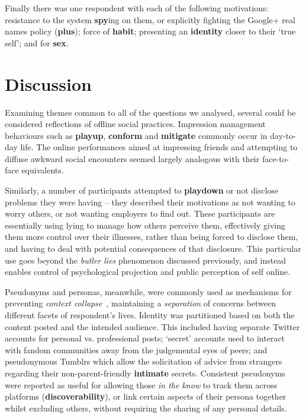 \documentclass{sig-alternate}
\newcommand{\todo}[1]{\textbf{\color{red}TODO: #1}}
\newcommand{\stag}[1]{\textbf{#1}}
\begin{document}
Finally there was one respondent with each of the following motivations: resistance to the system \stag{spy}ing on them, or explicitly fighting the Google+ real names policy (\stag{plus}); force of \stag{habit}; presenting an \stag{identity} closer to their `true self'; and for \stag{sex}.



\section{Discussion}

Examining themes common to all of the questions we analysed, several could be considered reflections of offline social practices. Impression management behaviours such as \stag{playup}, \stag{conform} and \stag{mitigate} 
commonly occur in day-to-day life. The online performances aimed at impressing friends and attempting to diffuse awkward social encounters seemed largely analogous with their face-to-face equivalents.

Similarly, a number of participants attempted to \stag{playdown} or not disclose problems they were having --
they described their motivations as not wanting to worry others, or not wanting employers to find out.
These participants are essentially using lying to manage how others perceive them, effectively giving them more control over their illnesses, rather than being forced to disclose them, and having to deal with potential consequences of that disclosure. This particular use goes beyond the \emph{butler lies} phenomenon discussed previously, and instead enables control of psychological projection and public perception of self online.

Pseudonyms and personas, meanwhile, were commonly used as mechanisms for preventing \emph{context collapse}~\cite{hogan2010presentation,boyd2002faceted,Marwick2010}, maintaining a \emph{separation} of concerns between different facets of respondent's lives. 
Identity was partitioned based on both the content posted and the intended audience. This included having separate Twitter accounts for personal vs. professional posts; `secret' accounts used to interact with fandom communities away from the judgemental eyes of peers; and pseudonymous Tumblrs which allow the solicitation of advice from strangers regarding their non-parent-friendly \stag{intimate} secrets.  Consistent pseudonyms were reported as useful for allowing those \emph{in the know} to track them across platforms (\stag{discoverability}), or link certain aspects of their persona together whilst excluding others, without requiring the sharing of any personal details. 
\end{document}
